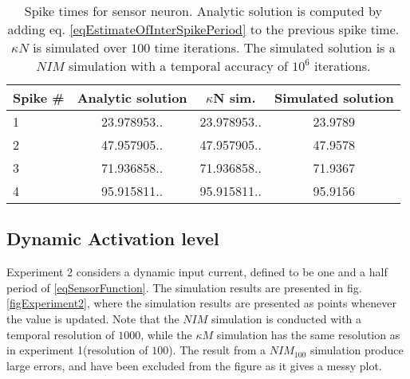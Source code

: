\begin{table}
	\centering
	\begin{tabular}{|l|ccc|}
		\hline 
		Spike \#	& Analytic solution & 	$\kappa$N sim. 	& Simulated solution \\ %
		\hline
		1 			& 23.978953.. 		& 	23.978953.. 			& 23.9789 			\\	
		2 			& 47.957905.. 		& 	47.957905.. 			& 47.9578 			\\
		3 			& 71.936858.. 	 	& 	71.936858.. 			& 71.9367 			\\
		4 			& 95.915811.. 	 	& 	95.915811.. 			& 95.9156 			
		\\ \hline 
	\end{tabular}
	\caption{Spike times for sensor neuron. 
				Analytic solution is computed by adding eq. \eqref{eqEstimateOfInterSpikePeriod} to the previous spike time. 
				$\kappa N$ is simulated over $100$ time iterations.  The simulated solution is a $NIM$ simulation with a temporal accuracy of $10^6$ iterations.}
	\label{tabSpikeTimesForKonstK}
\end{table}

		\subsection{Dynamic Activation level}
			Experiment 2 considers a dynamic input current, defined to be one and a half period of \eqref{eqSensorFunction}.
			The simulation results are presented in fig. \ref{figExperiment2}, where the simulation results are presented as points whenever the value is updated.
			Note that the $NIM$ simulation is conducted with a temporal resolution of $1000$, while the $\kappa M$ simulation has the same resolution as in experiment 1(resolution of $100$).
			The result from a $NIM_{100}$ simulation produce large errors, and have been excluded from the figure as it gives a messy plot. %

